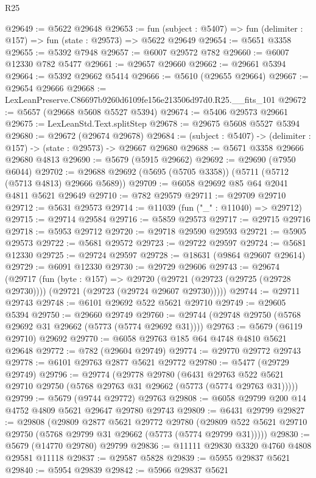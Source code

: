 \begin{lexlean}{R25}
\begin{coremodule}
@29649 := @5622 @29648
@29653 := fun (subject : @5407) => fun (delimiter : @157) => fun (state : @29573) => @5622 @29649
@29654 := @5651 @3358
@29655 := @5392 @7948
@29657 := @6007 @29572 @782
@29660 := @6007 @12330 @782 @5477
@29661 := @29657 @29660
@29662 := @29661 @5394
@29664 := @5392 @29662 @5414
@29666 := @5610 (@29655 @29664)
@29667 := @29654 @29666
@29668 := LexLeanPreserve.C86697b9260d6109fe156e213506d97d0.R25.__fits_101
@29672 := @5657 (@29668 @5608 @5527 @5394)
@29674 := @5406 @29573 @29661
@29675 := LexLeanStd.Text.splitStep
@29678 := @29675 @5608 @5527 @5394
@29680 := @29672 (@29674 @29678)
@29684 := (subject : @5407) -> (delimiter : @157) -> (state : @29573) -> @29667 @29680
@29688 := @5671 @3358 @29666 @29680 @4813
@29690 := @5679 (@5915 @29662)
@29692 := @29690 (@7950 @6044)
@29702 := @29688 @29692 (@5695 (@5705 @3358)) (@5711 (@5712 (@5713 @4813) @29666 @5689))
@29709 := @6058 @29692 @85 @64 @2041 @4811 @5621 @29649
@29710 := @782 @29579
@29711 := @29709 @29710
@29712 := @5631 @29573
@29714 := @11039 (fun ("_" : @11040) => @29712)
@29715 := @29714 @29584
@29716 := @5859 @29573
@29717 := @29715 @29716
@29718 := @5953 @29712
@29720 := @29718 @29590 @29593
@29721 := @5905 @29573
@29722 := @5681 @29572
@29723 := @29722 @29597
@29724 := @5681 @12330
@29725 := @29724 @29597
@29728 := @18631 (@9864 @29607 @29614)
@29729 := @6091 @12330
@29730 := @29729 @29606
@29743 := @29674
    (@29717
      (fun (byte : @157) =>
      @29720 (@29721 (@29723 (@29725 (@29728 @29730)))) (@29721 (@29723 (@29724 @29607 @29730)))))
@29744 := @29711 @29743
@29748 := @6101 @29692 @522 @5621 @29710
@29749 := @29605 @5394
@29750 := @29660 @29749
@29760 := @29744 (@29748 @29750 (@5768 @29692 @31 @29662 (@5773 (@5774 @29692 @31))))
@29763 := @5679 (@6119 @29710) @29692
@29770 := @6058 @29763 @185 @64 @4748 @4810 @5621 @29648
@29772 := @782 (@29604 @29749)
@29774 := @29770 @29772 @29743
@29778 := @6101 @29763 @2877 @5621 @29772
@29780 := @5477 (@29729 @29749)
@29796 := @29774
    (@29778
      @29780
      (@6431 @29763 @522 @5621 @29710 @29750 (@5768 @29763 @31 @29662 (@5773 (@5774 @29763 @31)))))
@29799 := @5679 (@9744 @29772) @29763
@29808 := @6058 @29799 @200 @14 @4752 @4809 @5621 @29647 @29780 @29743
@29809 := @6431 @29799
@29827 := @29808
    (@29809
      @2877
      @5621
      @29772
      @29780
      (@29809 @522 @5621 @29710 @29750 (@5768 @29799 @31 @29662 (@5773 (@5774 @29799 @31)))))
@29830 := @5679 (@14770 @29780) @29799
@29836 := @11111 @29830 @3320 @4760 @4808 @29581 @11118
@29837 := @29587 @5828
@29839 := @5955 @29837 @5621
@29840 := @5954 @29839
@29842 := @5966 @29837 @5621

\end{coremodule}
\end{lexlean}
